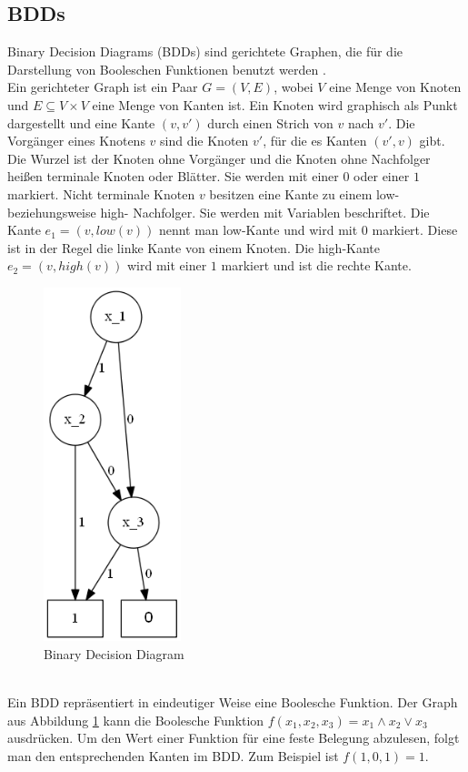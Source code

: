 \documentclass[a4,abstract=on]{scrartcl}
\begin{document}
\subsection{BDDs}
Binary Decision Diagrams (BDDs) sind gerichtete Graphen, die für die Darstellung von Booleschen Funktionen benutzt werden \cite[vgl.][Seite 109-110]{bdd}.\\
Ein gerichteter Graph ist ein Paar $G=(V, E)$, wobei $V$ eine Menge von Knoten und $E \subseteq V \times V$  eine Menge von Kanten ist. Ein Knoten wird graphisch als Punkt dargestellt und eine Kante $(v, v')$ durch einen Strich von $v$ nach $v'$. Die Vorgänger eines Knotens $v$ sind die Knoten $v'$, für die es Kanten $(v', v)$ gibt. Die Wurzel ist der Knoten ohne Vorgänger und die Knoten ohne Nachfolger heißen terminale Knoten oder Blätter. Sie werden mit einer $0$ oder einer $1$ markiert. Nicht terminale Knoten $v$ besitzen eine Kante zu einem low- beziehungsweise high- Nachfolger. Sie werden mit Variablen beschriftet. Die Kante $e_1 = (v, low(v))$ nennt man low-Kante und wird mit $0$ markiert. Diese ist in der Regel die linke Kante von einem Knoten. Die high-Kante $e_2 = (v, high(v))$ wird mit einer $1$ markiert und ist die rechte Kante.

\begin{figure}[H]
\centering
\includegraphics[width=4cm]{bdd.png}
\caption{Binary Decision Diagram}
\label{fig:bdd}
\end{figure}
\ \\
Ein BDD repräsentiert in eindeutiger Weise eine Boolesche Funktion. Der Graph aus Abbildung \ref{fig:bdd} kann die Boolesche Funktion $f(x_1,x_2,x_3) = x_1\wedge x_2 \vee x_3$ ausdrücken. Um den Wert einer Funktion für eine feste Belegung abzulesen, folgt man den entsprechenden Kanten im BDD. Zum Beispiel ist $f(1,0,1)=1$.
\end{document}
